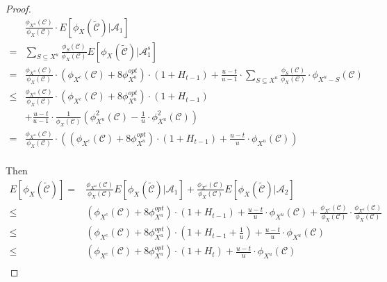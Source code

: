 \begin{lemma}
\begin{proof}
         \begin{equation}
         \begin{aligned}
         &\frac{\phi_{X^{u}}(\mathcal{C})}{\phi_{X}(\mathcal{C})} \cdot E[\phi_{X}(\tilde{\mathcal{C}})|\mathscr{A}_{1}] \\
        = & \sum_{S \subseteq X^{u}} \frac{\phi_{S}(\mathcal{C})}{\phi_{X}(\mathcal{C})} E[\phi_{X}(\tilde{\mathcal{C}})|\mathscr{A}_{1}^{s}]\\ 
         = & \frac{\phi_{X^{u}}(\mathcal{C})}{\phi_{X}(\mathcal{C})} \cdot \left(\phi_{X^{c}}(\mathcal{C}) + 8\phi^{opt}_{X^{u} }\right)\cdot (1+H_{t-1}) + \frac{u-t}{u-1}\cdot \sum_{S \subseteq X^{u}} \frac{\phi_{S}(\mathcal{C})}{\phi_{X}(\mathcal{C})}\cdot \phi_{X^{u} - S}(\mathcal{C})\\
         \leq &  \frac{\phi_{X^{u}}(\mathcal{C})}{\phi_{X}(\mathcal{C})} \cdot \left(\phi_{X^{c}}(\mathcal{C}) + 8\phi^{opt}_{X^{u} }\right)\cdot (1+H_{t-1})  \\
         & + \frac{u-t}{u-1}\cdot \frac{1}{\phi_{X}(\mathcal{C})} \left(\phi_{X^{u}}^{2}(\mathcal{C}) - \frac{1}{u} \cdot \phi_{X^{u}}^{2}(\mathcal{C}) \right) \\
         = & \frac{\phi_{X^{u}}(\mathcal{C})}{\phi_{X}(\mathcal{C})} \cdot \left(\left(\phi_{X^{c}}(\mathcal{C}) + 8\phi^{opt}_{X^{u} }\right)\cdot (1+H_{t-1}) + \frac{u - t}{u} \cdot \phi_{X^{u}}(\mathcal{C}) \right) \\
         \end{aligned}     
         \end{equation}
         
         Then 
         \begin{equation}
         \begin{aligned}
         E[\phi_{X}(\tilde{\mathcal{C}})] = &\frac{\phi_{X^{u}}(\mathcal{C})}{\phi_{X}(\mathcal{C})} E[\phi_{X}(\tilde{\mathcal{C}})|\mathscr{A}_{1}] + \frac{\phi_{X^{c}}(\mathcal{C})}{\phi_{X}(\mathcal{C})} E[\phi_{X}(\tilde{\mathcal{C}})|\mathscr{A}_{2}] \\
         \leq &   \left(\phi_{X^{c}}(\mathcal{C}) + 8\phi^{opt}_{X^{u}}\right)\cdot (1+H_{t-1}) + \frac{u-t }{u}\cdot \phi_{X^{u}}(\mathcal{C}) + \frac{\phi_{X^{c}}(\mathcal{C})}{\phi_{X}(\mathcal{C})} \cdot \frac{\phi_{X^{u}}(\mathcal{C})}{\phi_{X}(\mathcal{C})} \\
         \leq &  \left(\phi_{X^{c}}(\mathcal{C}) + 8\phi^{opt}_{X^{u}}\right)\cdot (1+H_{t-1} + \frac{1}{u}) + \frac{u-t }{u}\cdot \phi_{X^{u}}(\mathcal{C})\\
           \leq &  \left(\phi_{X^{c}}(\mathcal{C}) + 8\phi^{opt}_{X^{u}}\right)\cdot (1+H_{t}) + \frac{u-t }{u}\cdot \phi_{X^{u}}(\mathcal{C})\\
         \end{aligned}     
         \end{equation}
         \end{proof}  
         \end{lemma}
